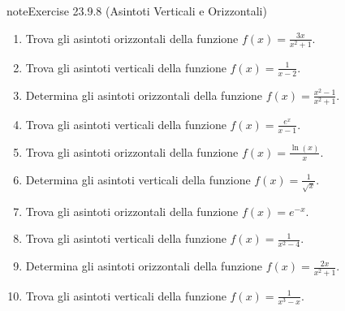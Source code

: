 \documentclass[letterpaper,10pt,italian]{jupyterBook}
\begin{document}
\begin{sphinxadmonition}{note}{Exercise 23.9.8 (Asintoti Verticali e Orizzontali)}


\begin{enumerate}
%
\item {} 
\sphinxAtStartPar
Trova gli asintoti orizzontali della funzione \(f(x) = \frac{3x}{x^2 + 1}\).

\item {} 
\sphinxAtStartPar
Trova gli asintoti verticali della funzione \(f(x) = \frac{1}{x - 2}\).

\item {} 
\sphinxAtStartPar
Determina gli asintoti orizzontali della funzione \(f(x) = \frac{x^2 - 1}{x^2 + 1}\).

\item {} 
\sphinxAtStartPar
Trova gli asintoti verticali della funzione \(f(x) = \frac{e^x}{x - 1}\).

\item {} 
\sphinxAtStartPar
Trova gli asintoti orizzontali della funzione \(f(x) = \frac{\ln(x)}{x}\).

\item {} 
\sphinxAtStartPar
Determina gli asintoti verticali della funzione \(f(x) = \frac{1}{\sqrt{x}}\).

\item {} 
\sphinxAtStartPar
Trova gli asintoti orizzontali della funzione \(f(x) = e^{-x}\).

\item {} 
\sphinxAtStartPar
Trova gli asintoti verticali della funzione \(f(x) = \frac{1}{x^2 - 4}\).

\item {} 
\sphinxAtStartPar
Determina gli asintoti orizzontali della funzione \(f(x) = \frac{2x}{x^2 + 1}\).

\item {} 
\sphinxAtStartPar
Trova gli asintoti verticali della funzione \(f(x) = \frac{1}{x^3 - x}\).

\end{enumerate}
\end{sphinxadmonition}
 \label{exercise:ch/infinitesimal_calculus/analysis-problems-exercise-8}
\end{document}
